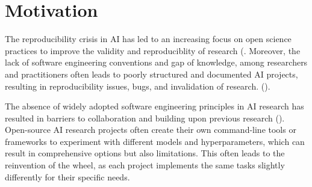 
\section{Motivation}


The reproducibility crisis in AI has led to an increasing focus on open science practices to improve the validity and reproduciblity of research (\cite{coro2020open,braun2018open,hicks2021open,paton2019open,kocak2022transparency,stodden-towardreprodicibleresearch}. Moreover, the lack of software engineering conventions and gap of knowledge, among researchers and practitioners often leads to poorly structured and documented AI projects, resulting in reproducibility issues, bugs, and invalidation of research. (\cite{leakage-recrisis,epskamp2019reproducibilitybug, seAIsurvey, martinez2022softwareAI,mainatiblity}).
 

The absence of widely adopted software engineering principles in AI research has resulted in barriers to collaboration and building upon previous research (\cite{accountabilityInAi}). Open-source AI research projects often create their own command-line tools or frameworks to experiment with different models and hyperparameters, which can result in comprehensive options but also limitations. This often leads to the reinvention of the wheel, as each project implements the same tasks slightly differently for their specific needs.


